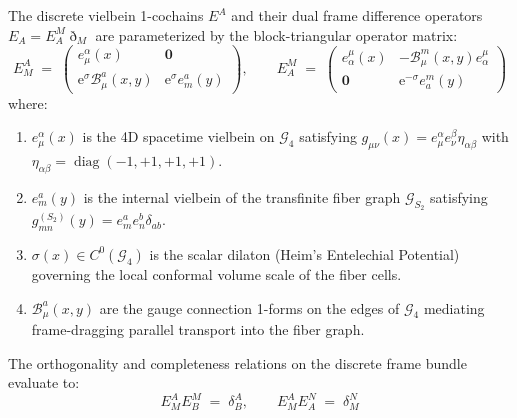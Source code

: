 \documentclass[
    12pt,
    a4paper,
    headings=normal,
    twoside=false,
    open=any,
    parskip=half
]{scrbook}
\DeclareMathOperator{\diag}{diag}
\newcommand{\ethop}{\eth}
\newcommand{\eu}{\mathrm{e}}
\begin{document}
\begin{physdefinition}\label{def:ch2_triangular_vielbein}
The discrete vielbein 1-cochains $E^A$ and their dual frame difference operators $E_A = E_A^M \ethop_M$ are parameterized by the block-triangular operator matrix:
\begin{equation}
E^A_M \;=\; \begin{pmatrix}
e^\alpha_\mu(x) & \mathbf{0} \\
\eu^\sigma \mathcal{B}^a_\mu(x, y) & \eu^\sigma e^a_m(y)
\end{pmatrix}, \qquad 
E_A^M \;=\; \begin{pmatrix}
e_\alpha^\mu(x) & -\mathcal{B}^m_\mu(x, y) e_\alpha^\mu \\
\mathbf{0} & \eu^{-\sigma} e_a^m(y)
\end{pmatrix}
\label{eq:ch2_triangular_vielbein_matrices}
\end{equation}
where:
\begin{enumerate}[label=(\alph*), noitemsep]
    \item $e^\alpha_\mu(x)$ is the 4D spacetime vielbein on $\mathcal{G}_4$ satisfying $g_{\mu\nu}(x) = e^\alpha_\mu e^\beta_\nu \eta_{\alpha\beta}$ with $\eta_{\alpha\beta} = \diag(-1, +1, +1, +1)$.
    \item $e^a_m(y)$ is the internal vielbein of the transfinite fiber graph $\mathcal{G}_{S_2}$ satisfying $g_{mn}^{(S_2)}(y) = e^a_m e^b_n \delta_{ab}$.
    \item $\sigma(x) \in C^0(\mathcal{G}_4)$ is the scalar dilaton (Heim's Entelechial Potential) governing the local conformal volume scale of the fiber cells.
    \item $\mathcal{B}^a_\mu(x, y)$ are the gauge connection 1-forms on the edges of $\mathcal{G}_4$ mediating frame-dragging parallel transport into the fiber graph.
\end{enumerate}
\end{physdefinition}

The orthogonality and completeness relations on the discrete frame bundle evaluate to:
\begin{equation}
E^A_M E_B^M \;=\; \delta^A_B, \qquad E^A_M E_A^N \;=\; \delta^N_M
\label{eq:ch2_vielbein_completeness}
\end{equation}
\end{document}
